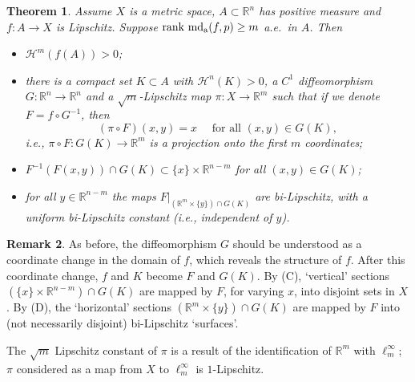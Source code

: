 \documentclass[12pt,leqno]{amsart}
\newtheorem{theorem}{Theorem}
\theoremstyle{definition}
\newtheorem{remark}[theorem]{Remark}
\newcommand{\bbbr}{\mathbb R}
\def\H{{\mathcal H}}
\def\rank{{\rm rank\,}}
\def\apmd{\operatorname{md_{\rm a}}}
\numberwithin{theorem}{section} \numberwithin{equation}{section}
\begin{document}
\begin{theorem}
\label{6:metric TFU}
Assume $X$ is a metric space, $A\subset\bbbr^n$ has positive measure and ${f:A\to X}$ is Lipschitz. Suppose $\rank \apmd(f,p)\geq m$ a.e.\ in $A$. Then
\begin{itemize}
\item[(A)] $\H^m(f(A))>0$;
\item[(B)] there is a compact set $K\subset A$ with $\H^n(K)>0$, a $C^1$ diffeomorphism $G:\bbbr^n\to\bbbr^n$ and a $\sqrt{m}$-Lipschitz map $\pi:X\to \bbbr^m$ such that if we denote $F=f\circ G^{-1}$, then
$$
(\pi\circ F)(x,y)=x \quad \text{ for all }(x,y)\in G(K),
$$
i.e., $\pi\circ F:G(K)\to\bbbr^m$ is a projection onto the first $m$ coordinates;
\item[(C)] $F^{-1}(F(x,y))\cap G(K)
\subset \{x\}\times \bbbr^{n-m}$ for all $(x,y)\in G(K)$;
\item[(D)] for all $y\in\bbbr^{n-m}$ the maps $F|_{(\bbbr^m\times\{y\})\cap G(K)}$ are bi-Lipschitz, with a uniform bi-Lipschitz constant (i.e., independent of $y$).
\end{itemize}
\end{theorem}
\begin{remark}
\label{6:rem1}
As before, the diffeomorphism $G$ should be understood as a coordinate change in the domain of $f$, which reveals the structure of $f$. After this coordinate change, $f$ and $K$ become $F$ and $G(K)$. By (C), `vertical' sections $(\{x\}\times \bbbr^{n-m})\cap G(K)$ are mapped by $F$, for varying $x$, into disjoint sets in $X$. By (D), the `horizontal' sections $(\bbbr^m\times\{y\})\cap G(K)$ are mapped by $F$ into (not necessarily disjoint) bi-Lipschitz `surfaces'.

The $\sqrt{m}$ Lipschitz constant of $\pi$ is a result of the identification of $\bbbr^m$ with $\ell^\infty_m$; $\pi$ considered as a map from $X$ to $\ell^\infty_m$ is $1$-Lipschitz.
\end{remark}
\end{document}
